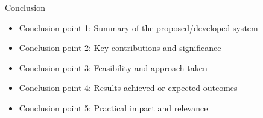 
\begin{frame}{Conclusion}
    \begin{itemize}
        \item Conclusion point 1: Summary of the proposed/developed system
        \item Conclusion point 2: Key contributions and significance
        \item Conclusion point 3: Feasibility and approach taken
        \item Conclusion point 4: Results achieved or expected outcomes
        \item Conclusion point 5: Practical impact and relevance
    \end{itemize}
\end{frame}
